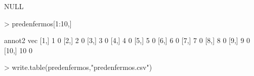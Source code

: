 \documentclass[12pt]{article}
\begin{document}
\begin{Schunk}
\begin{Soutput}
NULL
\end{Soutput}
\begin{Sinput}
> predenfermos[1:10,]
\end{Sinput}
\begin{Soutput}
      annot2 vec
 [1,]      1   0
 [2,]      2   0
 [3,]      3   0
 [4,]      4   0
 [5,]      5   0
 [6,]      6   0
 [7,]      7   0
 [8,]      8   0
 [9,]      9   0
[10,]     10   0
\end{Soutput}
\begin{Sinput}
> write.table(predenfermos,"predenfermos.csv")
\end{Sinput}
\end{Schunk}
\end{document}
